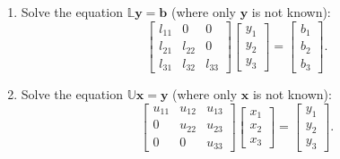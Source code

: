 \begin{enumerate}
	\item Solve the equation $ \mathbb{L}\textbf{y} = \textbf{b} $ (where only $ \textbf{y} $ is not known):
	\begin{equation}\label{Equation:LU-decomposition-solving-Lyb}
		\begin{bmatrix}
			l_{11} & 0      & 0          \\
			l_{21} & l_{22} & 0          \\
			l_{31} & l_{32} & l_{33}
		\end{bmatrix}
		\begin{bmatrix}
			y_{1} \\
			y_{2} \\
			y_{3}
		\end{bmatrix}
		=
		\begin{bmatrix}
			b_{1} \\
			b_{2} \\
			b_{3}
		\end{bmatrix}.
	\end{equation}
	\item Solve the equation $ \mathbb{U}\textbf{x} = \textbf{y} $ (where only $ \textbf{x} $ is not known):
	\begin{equation}\label{Equation:LU-decomposition-solving-Uxy}
		\begin{bmatrix}
			u_{11} & u_{12} & u_{13} \\
			0      & u_{22} & u_{23} \\
			0      & 0      & u_{33}
		\end{bmatrix}
		\begin{bmatrix}
			x_{1} \\
			x_{2} \\
			x_{3}
		\end{bmatrix}
		=
		\begin{bmatrix}
			y_{1} \\
			y_{2} \\
			y_{3}
		\end{bmatrix}.
	\end{equation}
\end{enumerate}

